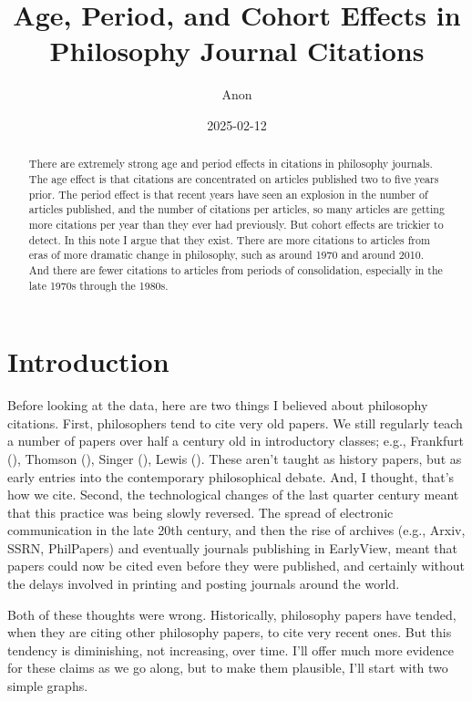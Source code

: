 \documentclass[
  12pt,
  letterpaper,
  DIV=11,
  numbers=noendperiod]{scrartcl}
\title{Age, Period, and Cohort Effects in Philosophy Journal Citations}
\author{Anon}
\date{2025-02-12}
\begin{document}
\maketitle
\begin{abstract}
There are extremely strong age and period effects in citations in
philosophy journals. The age effect is that citations are concentrated
on articles published two to five years prior. The period effect is that
recent years have seen an explosion in the number of articles published,
and the number of citations per articles, so many articles are getting
more citations per year than they ever had previously. But cohort
effects are trickier to detect. In this note I argue that they exist.
There are more citations to articles from eras of more dramatic change
in philosophy, such as around 1970 and around 2010. And there are fewer
citations to articles from periods of consolidation, especially in the
late 1970s through the 1980s.
\end{abstract}


\section{Introduction}\label{sec-introduction}

Before looking at the data, here are two things I believed about
philosophy citations. First, philosophers tend to cite very old papers.
We still regularly teach a number of papers over half a century old in
introductory classes; e.g., Frankfurt
(), Thomson
(), Singer
(), Lewis
(). These aren't taught as history
papers, but as early entries into the contemporary philosophical debate.
And, I thought, that's how we cite. Second, the technological changes of
the last quarter century meant that this practice was being slowly
reversed. The spread of electronic communication in the late 20th
century, and then the rise of archives (e.g., Arxiv, SSRN, PhilPapers)
and eventually journals publishing in EarlyView, meant that papers could
now be cited even before they were published, and certainly without the
delays involved in printing and posting journals around the world.

Both of these thoughts were wrong. Historically, philosophy papers have
tended, when they are citing other philosophy papers, to cite very
recent ones. But this tendency is diminishing, not increasing, over
time. I'll offer much more evidence for these claims as we go along, but
to make them plausible, I'll start with two simple graphs.
\end{document}
